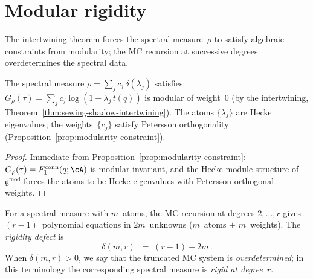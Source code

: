 \section{Modular rigidity}%
\label{sec:modular-rigidity-theory}%

The intertwining theorem forces the spectral measure~$\rho$
to satisfy algebraic constraints from modularity; the MC
recursion at successive degrees overdetermines the spectral
data.

\begin{proposition}%
\label{prop:modularity-constraint-atoms}%
\ClaimStatusConditional%
%
The spectral measure $\rho = \sum_j c_j\,\delta(\lambda_j)$
satisfies: $G_\rho(\tau) = \sum_j c_j \log(1 - \lambda_j
\,t(q))$ is modular of weight~$0$
\textup{(}by the intertwining,
Theorem~\textup{\ref{thm:sewing-shadow-intertwining}}\textup{)}.
The atoms $\{\lambda_j\}$ are Hecke eigenvalues; the
weights~$\{c_j\}$ satisfy Petersson orthogonality
\textup{(}Proposition~\textup{\ref{prop:modularity-constraint}}\textup{)}.
\end{proposition}

\begin{proof}
Immediate from
Proposition~\ref{prop:modularity-constraint}:
$G_\rho(\tau) = F_1^{\mathrm{conn}}(q;\cA)$ is modular
invariant, and the Hecke module structure of
$\mathfrak{g}^{\mathrm{mod}}$ forces the atoms to be Hecke
eigenvalues with Petersson-orthogonal weights.
\end{proof}

\begin{definition}%
\label{def:rigidity-defect}%
%
For a spectral measure with $m$~atoms, the MC recursion at
degrees $2, \ldots, r$ gives $(r{-}1)$~polynomial equations in
$2m$~unknowns ($m$~atoms $+$ $m$~weights). The
\emph{rigidity defect} is
\begin{equation}\label{eq:rigidity-defect}
 \delta(m, r) \;:=\; (r - 1) - 2m\,.
\end{equation}
When $\delta(m,r)>0$, we say that the truncated MC system is
\emph{overdetermined}; in this terminology the corresponding
spectral measure is \emph{rigid at degree~$r$}.
\end{definition}

